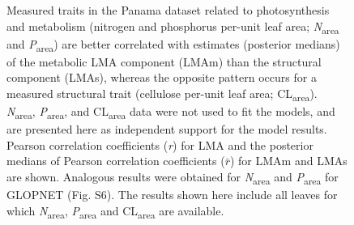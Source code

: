 \documentclass[
  12pt,
  letterpaper,
  DIV=11,
  numbers=noendperiod]{scrartcl}
\begin{document}
\newpage

\begin{figure}


\caption{\label{fig-pa_npc}Measured traits in the Panama dataset related
to photosynthesis and metabolism (nitrogen and phosphorus per-unit leaf
area; \emph{N}\textsubscript{area} and \emph{P}\textsubscript{area}) are
better correlated with estimates (posterior medians) of the metabolic
LMA component (LMAm) than the structural component (LMAs), whereas the
opposite pattern occurs for a measured structural trait (cellulose
per-unit leaf area; CL\textsubscript{area}).
\emph{N}\textsubscript{area}, \emph{P}\textsubscript{area}, and
CL\textsubscript{area} data were not used to fit the models, and are
presented here as independent support for the model results. Pearson
correlation coefficients (\emph{r}) for LMA and the posterior medians of
Pearson correlation coefficients (\(\bar{r}\)) for LMAm and LMAs are
shown. Analogous results were obtained for \emph{N}\textsubscript{area}
and \emph{P}\textsubscript{area} for GLOPNET (Fig. S6). The results
shown here include all leaves for which \emph{N}\textsubscript{area},
\emph{P}\textsubscript{area} and CL\textsubscript{area} are available.}

\end{figure}%
\end{document}
